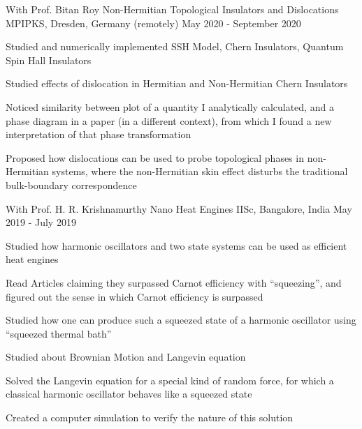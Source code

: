 \begin{cventries}
\cventry
{With Prof. Bitan Roy} %
{Non-Hermitian Topological Insulators and Dislocations} %
{MPIPKS, Dresden, Germany (remotely)} %
{May 2020 - September 2020} %
{
	\begin{cvitems} %
		\item {Studied and numerically implemented SSH Model, Chern Insulators, Quantum Spin Hall Insulators}
		\item {Studied effects of dislocation in Hermitian and Non-Hermitian Chern Insulators}
		\item {Noticed similarity between plot of a quantity I analytically calculated, and a phase diagram in a paper (in a different context), from which I found a new interpretation of that phase transformation}
		\item {Proposed how dislocations can be used to probe topological phases in non-Hermitian systems, where the non-Hermitian skin effect disturbs the traditional bulk-boundary correspondence}
	\end{cvitems}
}

  \cventry
    {With Prof. H. R. Krishnamurthy} %
    {Nano Heat Engines} %
    {IISc, Bangalore, India} %
    {May 2019 - July 2019} %
    {
      \begin{cvitems} %
        \item {Studied how harmonic oscillators and two state systems can be used as efficient heat engines}
        \item {Read Articles claiming they surpassed Carnot efficiency with ``squeezing'', and figured out the sense in which Carnot efficiency is surpassed}
        \item {Studied how one can produce such a squeezed state of a harmonic oscillator using ``squeezed thermal bath''}
        \item {Studied about Brownian Motion and Langevin equation}
        \item {Solved the Langevin equation for a special kind of random force, for which a classical harmonic oscillator behaves like a squeezed state}
        \item {Created a computer simulation to verify the nature of this solution}
      \end{cvitems}
    }


\end{cventries}

